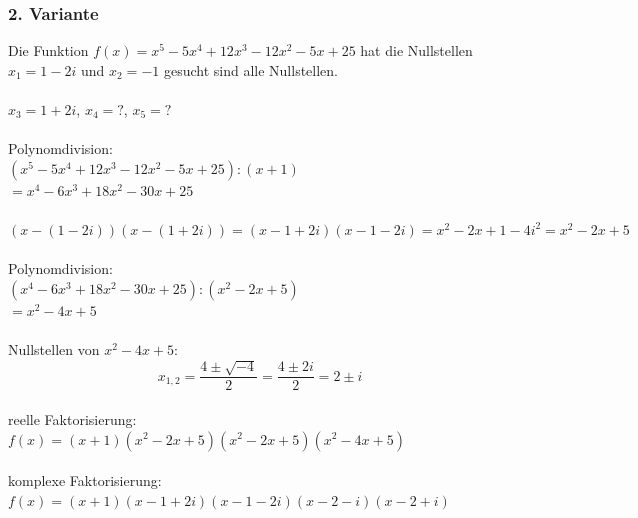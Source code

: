 \documentclass[10pt,a4paper,landscape]{article}
\begin{document}
\begin{multicols*}{3}
		\subsubsection{2. Variante}
		Die Funktion $f(x) = x^5 - 5x^4 + 12x^3 - 12x^2 -5x +25$ hat die Nullstellen $x_1 = 1 - 2i$ und $x_2 = -1$ gesucht sind alle Nullstellen.\\
		\\
		$x_3 = 1 + 2i$, $x_4 = ?$, $x_5 = ?$ \\
		\\
		Polynomdivision:\\
		$(x^5 - 5x^4 + 12x^3 - 12x^2 -5x +25) : (x +1)$\\$= x^4-6x^3+ 18x^2 -30x +25$\\
		\\
		$(x-(1-2i))(x-(1+2i)) = (x-1+2i)(x-1-2i) = x^2-2x+1-4i^2 = x^2-2x+5 $\\
		\\
		Polynomdivision:\\
		$( x^4-6x^3+ 18x^2 -30x +25) : (x^2-2x+5)$\\$= x^2-4x+5$\\
		\\
		Nullstellen von $x^2-4x+5$:\\
		\[ x_{1,2} = \frac{4 \pm \sqrt{-4}}{2} = \frac{4 \pm 2i}{2} = 2 \pm i \]
		\\
		reelle Faktorisierung:\\
		$f(x) = (x+1)(x^2-2x+5)(x^2-2x+5)(x^2-4x+5)$\\
		\\
		komplexe Faktorisierung:\\
		$f(x) =(x+1)(x-1+2i)(x-1-2i)(x-2-i)(x-2+i)$\\
		
		
	\end{multicols*}
\end{document}
